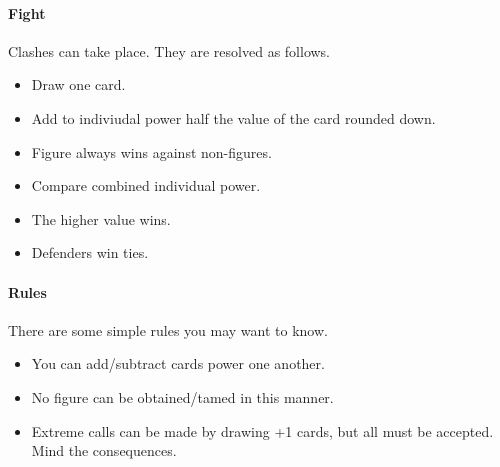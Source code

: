 \documentclass[10pt,a4paper]{report}
\begin{document}
\paragraph{Fight}
Clashes can take place. They are resolved as follows.
\begin{itemize}
\item Draw one card.
\item Add to indiviudal power half the value of the card rounded down.
\item Figure always wins against non-figures.
\item Compare combined individual power.
\item The higher value wins.
\item Defenders win ties.
\end{itemize}

\paragraph{Rules}
There are some simple rules you may want to know.
\begin{itemize}
\item You can add/subtract cards power one another.
\item No figure can be obtained/tamed in this manner.
\item Extreme calls can be made by drawing +1 cards, but all must be accepted. Mind the consequences.
\end{itemize}
\end{document}
